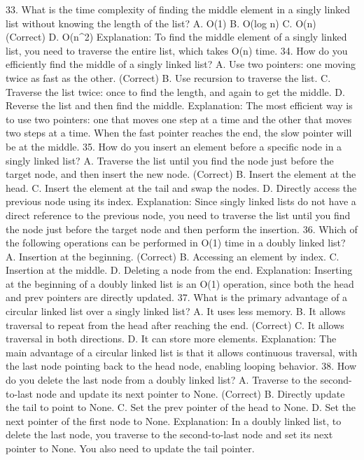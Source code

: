 33. What is the time complexity of finding the middle element in a singly linked list without knowing the length of the list?
A. O(1)
B. O(log n)
C. O(n) (Correct)
D. O(n^2)
Explanation: To find the middle element of a singly linked list, you need to traverse the entire list, which takes O(n) time.
34. How do you efficiently find the middle of a singly linked list?
A. Use two pointers: one moving twice as fast as the other. (Correct)
B. Use recursion to traverse the list.
C. Traverse the list twice: once to find the length, and again to get the middle.
D. Reverse the list and then find the middle.
Explanation: The most efficient way is to use two pointers: one that moves one step at a time and the other that moves two steps at a time. When the fast pointer reaches the end, the slow pointer will be at the middle.
35. How do you insert an element before a specific node in a singly linked list?
A. Traverse the list until you find the node just before the target node, and then insert the new node. (Correct)
B. Insert the element at the head.
C. Insert the element at the tail and swap the nodes.
D. Directly access the previous node using its index.
Explanation: Since singly linked lists do not have a direct reference to the previous node, you need to traverse the list until you find the node just before the target node and then perform the insertion.
36. Which of the following operations can be performed in O(1) time in a doubly linked list?
A. Insertion at the beginning. (Correct)
B. Accessing an element by index.
C. Insertion at the middle.
D. Deleting a node from the end.
Explanation: Inserting at the beginning of a doubly linked list is an O(1) operation, since both the head and prev pointers are directly updated.
37. What is the primary advantage of a circular linked list over a singly linked list?
A. It uses less memory.
B. It allows traversal to repeat from the head after reaching the end. (Correct)
C. It allows traversal in both directions.
D. It can store more elements.
Explanation: The main advantage of a circular linked list is that it allows continuous traversal, with the last node pointing back to the head node, enabling looping behavior.
38. How do you delete the last node from a doubly linked list?
A. Traverse to the second-to-last node and update its next pointer to None. (Correct)
B. Directly update the tail to point to None.
C. Set the prev pointer of the head to None.
D. Set the next pointer of the first node to None.
Explanation: In a doubly linked list, to delete the last node, you traverse to the second-to-last node and set its next pointer to None. You also need to update the tail pointer.
